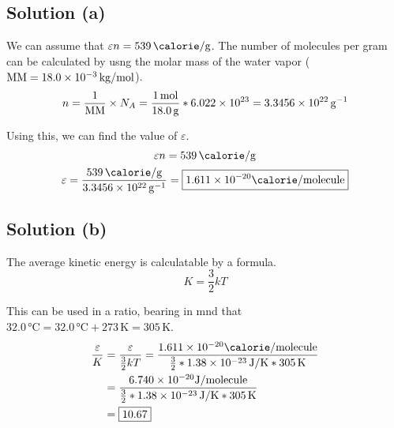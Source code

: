 \documentclass[12pt]{article}
\newcommand{\E}[1]{\times 10^{#1}}
\begin{document}
        \subsection{Solution (a)}
            We can assume that $\varepsilon n = 539\,\unit{\calorie/\gram}$.
            The number of molecules per gram can be calculated by usng the molar mass of the water vapor (${\rm MM} = 18.0\E{-3}\,\unit{\kilo\gram/\mole}$).
            \begin{equation}
                n   =   \frac{1}{\rm MM} \times N_A
                    =   \frac{1\,\unit{\mole}}{18.0\,\unit{\gram}} * 6.022\E{23}
                    =   3.3456\E{22}\,\unit{\gram^{-1}}
            \end{equation}

            Using this, we can find the value of $\varepsilon$.
            \begin{gather}
                \varepsilon n = 539\,\unit{\calorie/\gram}\\
                \varepsilon =   \frac{539\,\unit{\calorie/\gram}}{3.3456\E{22}\,\unit{\gram^{-1}}}
                    =   \boxed{1.611\E{-20}\unit{\calorie/\text{molecule}}}
            \end{gather}

        \subsection{Solution (b)}
            The average kinetic energy is calculatable by a formula.
            \begin{equation}
                K   =   \frac{3}{2} kT
            \end{equation}

            This can be used in a ratio, bearing in mnd that $32.0\,\unit{\celsius} = 32.0\,\unit{\celsius} + 273\,\unit{\kelvin} = 305\,\unit{\kelvin}$.
            \begin{align}
                \frac{\varepsilon}{K}   &=  \frac{\varepsilon}{\frac{3}{2} kT}
                    =   \frac{1.611\E{-20}\unit{\calorie/\text{molecule}}}{\frac{3}{2} * 1.38\E{-23}\,\unit{\joule/\kelvin} * 305\,\unit{\kelvin}}\\
                    &=  \frac{6.740\E{-20}\unit{\joule/\text{molecule}}}{\frac{3}{2} * 1.38\E{-23}\,\unit{\joule/\kelvin} * 305\,\unit{\kelvin}}\\
                    &=  \boxed{10.67}
            \end{align}
\end{document}
